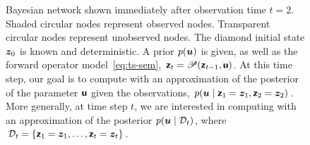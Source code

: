 \begin{figure}
    \centering
    \caption{Bayesian network shown immediately after observation time $t=2$. Shaded circular nodes represent observed nodes. Transparent circular nodes represent unobserved nodes. The diamond initial state $\boldsymbol{z}_0$ is known and deterministic. A prior $p(\boldsymbol{u})$ is given, as well as the forward operator model~\eqref{eq:ts-sem}, $\boldsymbol{\mathsf{z}}_t = \mathscr{P}(\boldsymbol{\mathsf{z}}_{t-1}, \boldsymbol{\mathsf{u}})$. At this time step, our goal is to compute with an approximation of the posterior of the parameter $\boldsymbol{\mathsf{u}}$ given the observations, $p(\boldsymbol{u} \mid \boldsymbol{\mathsf{z}}_1 = \boldsymbol{z}_1, \boldsymbol{\mathsf{z}}_2=\boldsymbol{z}_2)$. More generally, at time step $t$, we are interested in computing with an approximation of the posterior $p(\boldsymbol{u} \mid \mathcal{D}_t)$, where $\mathcal{D}_t = \{ \boldsymbol{\mathsf{z}}_1 = \boldsymbol{z}_1, \ldots, \boldsymbol{\mathsf{z}}_t=\boldsymbol{z}_t\}$.}
    \label{fig:ts_dag}
\end{figure}
